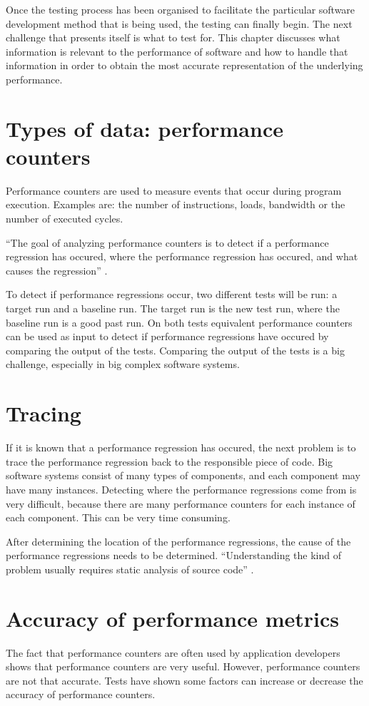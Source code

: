 Once the testing process has been organised to facilitate the particular software development method that is being used, the testing can finally begin. The next challenge that presents itself is what to test for. This chapter discusses what information is relevant to the performance of software and how to handle that information in order to obtain the most accurate representation of the underlying performance.

\section{Types of data: performance counters}
Performance counters are used to measure events that occur during program execution\cite{PC}. Examples are: the number of instructions, loads, bandwidth or the number of executed cycles.

``The goal of analyzing performance counters is to detect if a performance regression has occured, where the performance regression has occured, and what causes the regression'' \cite{nguyen2012using}.

To detect if performance regressions occur, two different tests will be run: a target run and a baseline run. The target run is the new test run, where the baseline run is a good past run. On both tests equivalent performance counters can be used as input to detect if performance regressions have occured by comparing the output of the tests. Comparing the output of the tests is a big challenge, especially in big complex software systems.

\section{Tracing}
If it is known that a performance regression has occured, the next problem is to trace the performance regression back to the responsible piece of code. Big software systems consist of many types of components, and each component may have many instances. Detecting where the performance regressions come from is very difficult, because there are many performance counters for each instance of each component. This can be very time consuming.

After determining the location of the performance regressions, the cause of the performance regressions needs to be determined. ``Understanding the kind of problem usually requires static analysis of source code'' \cite{nguyen2012using}.
\section{Accuracy of performance metrics}
The fact that performance counters are often used by application developers shows that performance counters are very useful. However, performance counters are not that accurate. Tests have shown some factors can increase or decrease the accuracy of performance counters.

